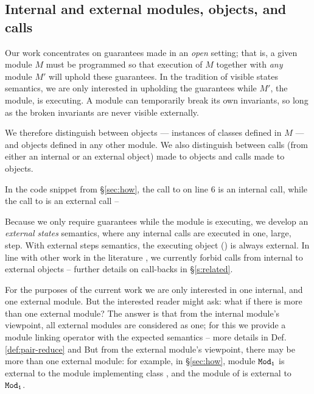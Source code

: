 { 

 
\subsection{Internal and external modules, objects, and calls}
\label{s:concepts}

Our work concentrates on guarantees made in an \emph{open} setting; that is, a given module
$M$ must be programmed so that 
execution of $M$ together with \emph{any} \externalM 
module $M'$ will uphold these guarantees. In the tradition of
visible states semantics, we are  only interested in upholding the guarantees while 
$M'$, the  \emph{\externalM} module, is executing. A module can
temporarily break its own invariants,
so long as the broken invariants are never visible externally.
   
We therefore distinguish between  \emph{\internalO}
objects --- instances of classes defined in $M$ ---
and \emph{\externalO} objects defined in any other module.
We also distinguish between
  \emph{\internalC} calls  (from either an internal or an external object)  made %
 to \internalO objects and \emph{\externalC} calls made %
 to \externalC objects. 
{In the code snippet from \S \ref{sec:how}, the call to  on line 6 is an 
 internal call, while the call to  is an external call -- 
 
%
%
Because we only require guarantees while 
the  \externalM module  is executing,
we develop an \emph{external states} semantics, where
 any internal calls are executed in one, large, step.
With external steps semantics,  the executing object () is always   external. 
  In line  with other work in the literature \cite{VerX, Grossman, Albert}, we currently forbid 
  calls from internal to  external objects
  -- further details on call-backs in \S\ref{s:related}. 

{For the purposes of the current work we are only interested in one internal, and one external module.
But the interested reader might ask: what if there is more than one external module?
The answer is that from the internal module's viewpoint, all external modules are considered as one;
for this we provide a module linking operator with  the expected semantics -- more details in Def. \ref{def:pair-reduce} and 
But from the external module's viewpoint, there may be more than one external module: for example, in \S \ref{sec:how}, 
module ${\texttt{Mod}}_{{\texttt{1}}}$ is external to the module implementing class , and the module of  is external to
${\texttt{Mod}}_{{\texttt{1}}}$.
}

}}
